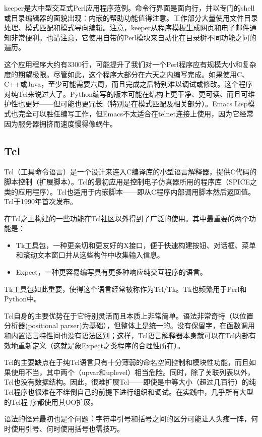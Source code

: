 \documentclass[12pt,oneside]{book}
\begin{document}
keeper是大中型交互式Perl应用程序范例。命令行界面是面向行，并以专门的shell或目录编辑器的面貌出现：内嵌的帮助功能值得注意。工作部分大量使用文件目录处理、模式匹配和模式导向编辑。注意，keeper从程序模板生成网页和电子邮件通知非常便利。也请注意，它使用自带的Perl模块来自动化在目录树不同功能之问的遍历。

这个应用程序大约有3300行，可能提升了我们对一个Perl程序应有规模大小和复杂度的期望极限。尽管如此，这个程序大部分在六天之内编写完成。如果使用C、C++或Java，至少可能需要六周，而且完成之后特别难以调试或修改。这个程序对纯Tcl来说过大了。Python编写的版本可能在结构上更干净、更可读、而且可维护性也更好——但可能也更冗长（特别是在模式匹配及相关部分）。Emacs Lisp模式也完全可以胜任编写工作，但Emacs不太适合在telnet连接上使用，因为它经常因为服务器拥挤而速度慢得像蜗牛。


\subsection{Tcl}
Tcl（工具命令语言）是一个设计来连入C编译库的小型语言解释器，提供C代码的脚本控制（扩展脚本）。Tcl的最初应用是控制电子仿真器所用的程序库（SPICE之类的应用程序）。Tcl也适用于内嵌脚本——即从C程序内部调用脚本然后返回值。Tcl于1990年首次发布。

在Tcl之上构建的一些功能在Tcl社区以外得到了广泛的使用。其中最重要的两个功能是：
\begin{itemize}
\item Tk工具包，一种更亲切和更友好的X接口，便于快速构建按钮、对话框、菜单和滚动文本窗口并从这些构件中收集输入信息。
\item Expect，一种更容易编写具有更多种响应纯交互程序的语言。
\end{itemize}

Tk工具包如此重要，使得这个语言经常被称作为Tcl/Tk。Tk也频繁用于Perl和Python中。

Tcl自身的主要优势在于它特别灵活而且本质上非常简单。语法非常奇特（以位置分析器(positional parser)为基础），但整体上是统一的。没有保留字，在函数调用和内置语言特性间也没有语法区别；这样，Tcl语言解释器本身就可以在Tcl内部有效地重新定义（这就是象Expect之类程序的合理性所在）。

Tcl的主要缺点在于纯Tcl语言只有十分薄弱的命名空间控制和模块性功能，而且如果使用不当，其中两个（upvar和uplevel）相当危险。同时，除了关联列表以外，Tcl也没有数据结构。因此，很难扩展Tcl——即使是中等大小（超过几百行）的纯Tcl程序也很难在不绊倒自己的前提下进行组织和调试。在实践中，几乎所有大型的Tcl程
序都使用其OO扩展。

语法的怪异最初也是个问题：字符串引号和括号之间的区分可能让人头疼一阵，何时使用引号、何时使用括号也需技巧。
\end{document}
